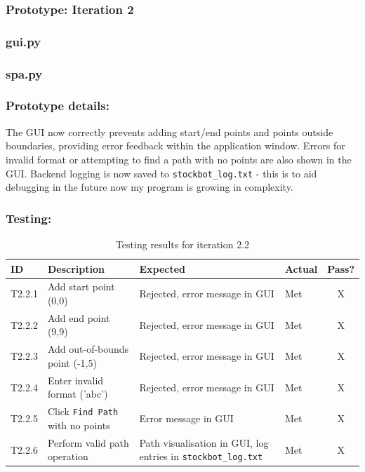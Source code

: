 \newpage %


\subsubsection*{Prototype: Iteration 2}
\subsubsection{gui.py}


\newpage

\subsubsection{spa.py}


\newpage %

\subsubsection{Prototype details:}
The GUI now correctly prevents adding start/end points and points outside boundaries, providing error feedback within the application window. Errors for invalid format or attempting to find a path with no points are also shown in the GUI. Backend logging is now saved to \verb|stockbot_log.txt| - this is to aid debugging in the future now my program is growing in complexity.

\subsubsection{Testing:}
\begin{table}[htbp]
	\centering
	\begin{tabularx}{\textwidth}{|l|X|p{4.5cm}|p{1.5cm}|c|}
		\hline
		\textbf{ID} & \textbf{Description} & \textbf{Expected} & \textbf{Actual} & \textbf{Pass?} \\
		\hline
		T2.2.1 & Add start point (0,0) & Rejected, error message in GUI & Met & X \\
		\hline
		T2.2.2 & Add end point (9,9) & Rejected, error message in GUI & Met & X \\
		\hline
		T2.2.3 & Add out-of-bounds point (-1,5) & Rejected, error message in GUI & Met & X \\
		\hline
		T2.2.4 & Enter invalid format ('abc') & Rejected, error message in GUI & Met & X \\
		\hline
		T2.2.5 & Click \verb|Find Path| with no points & Error message in GUI & Met & X \\
		\hline
		T2.2.6 & Perform valid path operation & Path visualisation in GUI, log entries in \verb|stockbot_log.txt| & Met & X \\
		\hline
	\end{tabularx}
	\caption{Testing results for iteration 2.2}
\end{table}

